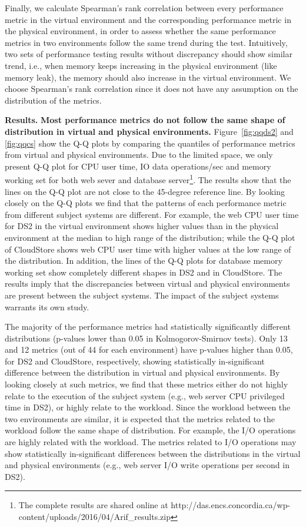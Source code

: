 \documentclass[smallextended]{svjour3}       %
\begin{document}
Finally, we calculate Spearman's rank correlation between every performance metric in the virtual environment and the corresponding performance metric in the physical environment, in order to assess whether the same performance metrics in two environments follow the same trend during the test. Intuitively, two sets of performance testing results without discrepancy should show similar trend, i.e., when memory keeps increasing in the physical environment (like memory leak), the memory should also increase in the virtual environment. We choose Spearman's rank correlation since it does not have any assumption on the distribution of the metrics. 

\noindent \textbf{Results.}
\textbf{Most performance metrics do not follow the same shape of distribution in virtual and physical environments.} Figure~\ref{fig:qqds2} and \ref{fig:qqcs} show the Q-Q plots by comparing the quantiles of performance metrics from virtual and physical environments. Due to the limited space, we only present Q-Q plot for CPU user time, IO data operations/sec and memory working set for both web sever and database server\footnote{The complete results are shared online at http://das.encs.concordia.ca/wp-content/uploads/2016/04/Arif\_results.zip}. The results show that the lines on the Q-Q plot are not close to the 45-degree reference line. By looking closely on the Q-Q plots we find that the patterns of each performance metric from different subject systems are different. For example, the web CPU user time for DS2 in the virtual environment shows higher values than in the physical environment at the median to high range of the distribution; while the Q-Q plot of CloudStore shows web CPU user time with higher values at the low range of the distribution. In addition, the lines of the Q-Q plots for database memory working set show completely different shapes in DS2 and in CloudStore. The results imply that the discrepancies between virtual and physical environments are present between the subject systems. The impact of the subject systems warrants its own study.

The majority of the performance metrics had statistically significantly different distributions (p-values lower than 0.05 in Kolmogorov-Smirnov tests). Only 13 and 12 metrics (out of 44 for each environment) have p-values higher than 0.05, for DS2 and CloudStore, respectively, showing statistically in-significant difference between the distribution in virtual and physical environments. By looking closely at such metrics, we find that these metrics either do not highly relate to the execution of the subject system (e.g., web server CPU privileged time in DS2), or highly relate to the workload. Since the workload between the two environments are similar, it is expected that the metrics related to the workload follow the same shape of distribution. For example, the I/O operations are highly related with the workload. The metrics related to I/O operations may show statistically in-significant differences between the distributions in the virtual and physical environments (e.g., web server I/O write operations per second in DS2). %
\end{document}
